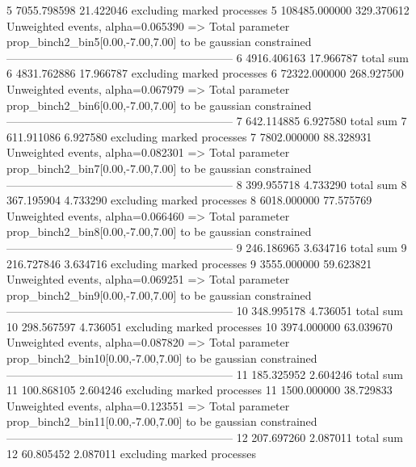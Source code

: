 5          7055.798598     21.422046       excluding marked processes    
5          108485.000000   329.370612      Unweighted events, alpha=0.065390
  => Total parameter prop_binch2_bin5[0.00,-7.00,7.00] to be gaussian constrained
------------------------------------------------------------
6          4916.406163     17.966787       total sum                     
6          4831.762886     17.966787       excluding marked processes    
6          72322.000000    268.927500      Unweighted events, alpha=0.067979
  => Total parameter prop_binch2_bin6[0.00,-7.00,7.00] to be gaussian constrained
------------------------------------------------------------
7          642.114885      6.927580        total sum                     
7          611.911086      6.927580        excluding marked processes    
7          7802.000000     88.328931       Unweighted events, alpha=0.082301
  => Total parameter prop_binch2_bin7[0.00,-7.00,7.00] to be gaussian constrained
------------------------------------------------------------
8          399.955718      4.733290        total sum                     
8          367.195904      4.733290        excluding marked processes    
8          6018.000000     77.575769       Unweighted events, alpha=0.066460
  => Total parameter prop_binch2_bin8[0.00,-7.00,7.00] to be gaussian constrained
------------------------------------------------------------
9          246.186965      3.634716        total sum                     
9          216.727846      3.634716        excluding marked processes    
9          3555.000000     59.623821       Unweighted events, alpha=0.069251
  => Total parameter prop_binch2_bin9[0.00,-7.00,7.00] to be gaussian constrained
------------------------------------------------------------
10         348.995178      4.736051        total sum                     
10         298.567597      4.736051        excluding marked processes    
10         3974.000000     63.039670       Unweighted events, alpha=0.087820
  => Total parameter prop_binch2_bin10[0.00,-7.00,7.00] to be gaussian constrained
------------------------------------------------------------
11         185.325952      2.604246        total sum                     
11         100.868105      2.604246        excluding marked processes    
11         1500.000000     38.729833       Unweighted events, alpha=0.123551
  => Total parameter prop_binch2_bin11[0.00,-7.00,7.00] to be gaussian constrained
------------------------------------------------------------
12         207.697260      2.087011        total sum                     
12         60.805452       2.087011        excluding marked processes    
